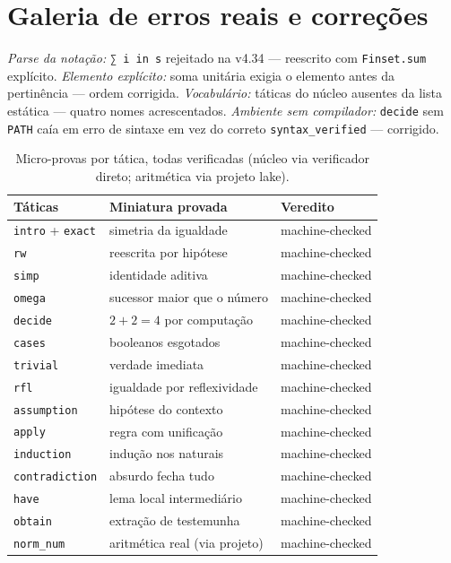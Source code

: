 \section{Galeria de erros reais e correções}
\textit{Parse da notação:} \texttt{∑ i in s} rejeitado na v4.34 --- reescrito com \texttt{Finset.sum} explícito. \textit{Elemento explícito:} soma unitária exigia o elemento antes da pertinência --- ordem corrigida. \textit{Vocabulário:} táticas do núcleo ausentes da lista estática --- quatro nomes acrescentados. \textit{Ambiente sem compilador:} \texttt{decide} sem \texttt{PATH} caía em erro de sintaxe em vez do correto \texttt{syntax\_verified} --- corrigido.
\begin{table}[htbp]
\fontsize{10}{12}\selectfont\SingleSpacing
\centering
\caption{Micro-provas por tática, todas verificadas (núcleo via verificador direto; aritmética via projeto lake).}
\label{tab:microprovas}
\begin{tabularx}{\textwidth}{lXX}
\toprule
Táticas & Miniatura provada & Veredito \\
\midrule
\texttt{intro} + \texttt{exact} & simetria da igualdade & machine-checked \\
\texttt{rw} & reescrita por hipótese & machine-checked \\
\texttt{simp} & identidade aditiva & machine-checked \\
\texttt{omega} & sucessor maior que o número & machine-checked \\
\texttt{decide} & $2+2=4$ por computação & machine-checked \\
\texttt{cases} & booleanos esgotados & machine-checked \\
\texttt{trivial} & verdade imediata & machine-checked \\
\texttt{rfl} & igualdade por reflexividade & machine-checked \\
\texttt{assumption} & hipótese do contexto & machine-checked \\
\texttt{apply} & regra com unificação & machine-checked \\
\texttt{induction} & indução nos naturais & machine-checked \\
\texttt{contradiction} & absurdo fecha tudo & machine-checked \\
\texttt{have} & lema local intermediário & machine-checked \\
\texttt{obtain} & extração de testemunha & machine-checked \\
\texttt{norm\_num} & aritmética real (via projeto) & machine-checked \\
\bottomrule
\end{tabularx}
\end{table}
